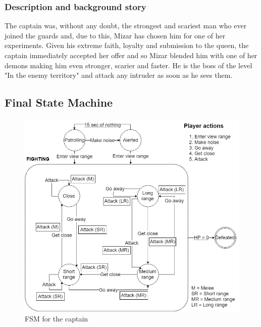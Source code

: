 \subsubsection{Description and background story}
The captain was, without any doubt, the strongest and scariest man who ever joined the guards and, due to this, Mizar has chosen him for one of her experiments. Given his extreme faith, loyalty and submission to the queen, the captain immediately accepted her offer and so Mizar blended him with one of her demons making him even stronger, scarier and faster. He is the boss of the level "In the enemy territory" and attack any intruder as soon as he sees them.

\subsection{Final State Machine}
\begin{figure}[H]
  \centering
  \includegraphics[width=\textwidth]{Images/Diagrams/FSMs/captainFSM}
  \caption{FSM for the captain}
\end{figure}

